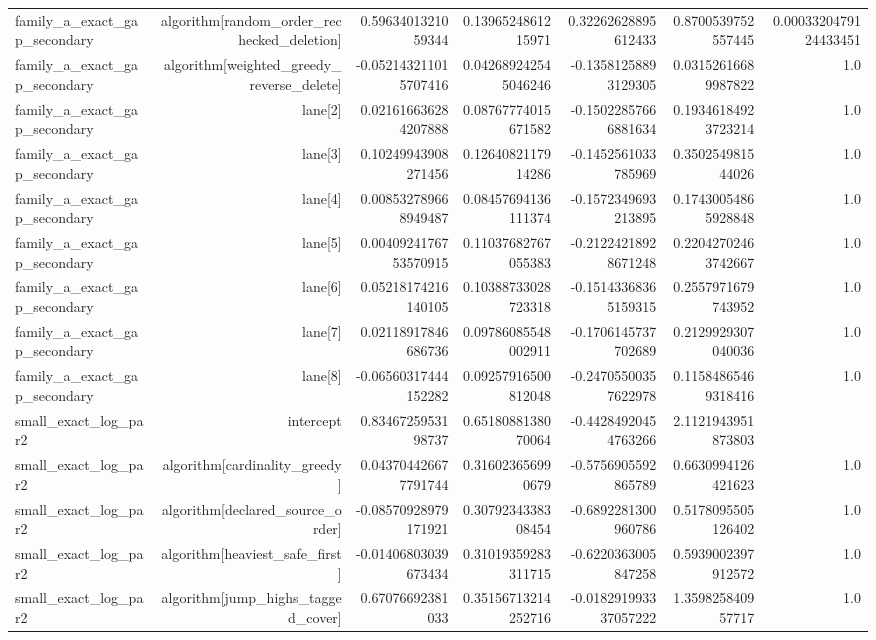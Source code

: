 {\begin{longtable}{lrrrrrr}
family\_a\_exact\_gap\_secondary & algorithm[random\_order\_rechecked\_deletion] & 0.5963401321059344 & 0.1396524861215971 & 0.32262628895612433 & 0.8700539752557445 & 0.0003320479124433451 \\
family\_a\_exact\_gap\_secondary & algorithm[weighted\_greedy\_reverse\_delete] & -0.052143211015707416 & 0.042689242545046246 & -0.13581258893129305 & 0.03152616689987822 & 1.0 \\
family\_a\_exact\_gap\_secondary & lane[2] & 0.021616636284207888 & 0.08767774015671582 & -0.15022857666881634 & 0.19346184923723214 & 1.0 \\
family\_a\_exact\_gap\_secondary & lane[3] & 0.10249943908271456 & 0.1264082117914286 & -0.1452561033785969 & 0.350254981544026 & 1.0 \\
family\_a\_exact\_gap\_secondary & lane[4] & 0.008532789668949487 & 0.08457694136111374 & -0.1572349693213895 & 0.17430054865928848 & 1.0 \\
family\_a\_exact\_gap\_secondary & lane[5] & 0.0040924176753570915 & 0.11037682767055383 & -0.21224218928671248 & 0.22042702463742667 & 1.0 \\
family\_a\_exact\_gap\_secondary & lane[6] & 0.05218174216140105 & 0.10388733028723318 & -0.15143368365159315 & 0.2557971679743952 & 1.0 \\
family\_a\_exact\_gap\_secondary & lane[7] & 0.02118917846686736 & 0.09786085548002911 & -0.1706145737702689 & 0.2129929307040036 & 1.0 \\
family\_a\_exact\_gap\_secondary & lane[8] & -0.06560317444152282 & 0.09257916500812048 & -0.24705500357622978 & 0.11584865469318416 & 1.0 \\
small\_exact\_log\_par2 & intercept & 0.8346725953198737 & 0.6518088138070064 & -0.44284920454763266 & 2.1121943951873803 &  \\
small\_exact\_log\_par2 & algorithm[cardinality\_greedy] & 0.043704426677791744 & 0.316023656990679 & -0.5756905592865789 & 0.6630994126421623 & 1.0 \\
small\_exact\_log\_par2 & algorithm[declared\_source\_order] & -0.08570928979171921 & 0.3079234338308454 & -0.6892281300960786 & 0.5178095505126402 & 1.0 \\
small\_exact\_log\_par2 & algorithm[heaviest\_safe\_first] & -0.01406803039673434 & 0.31019359283311715 & -0.6220363005847258 & 0.5939002397912572 & 1.0 \\
small\_exact\_log\_par2 & algorithm[jump\_highs\_tagged\_cover] & 0.67076692381033 & 0.35156713214252716 & -0.018291993337057222 & 1.359825840957717 & 1.0 \\

\end{longtable}}
